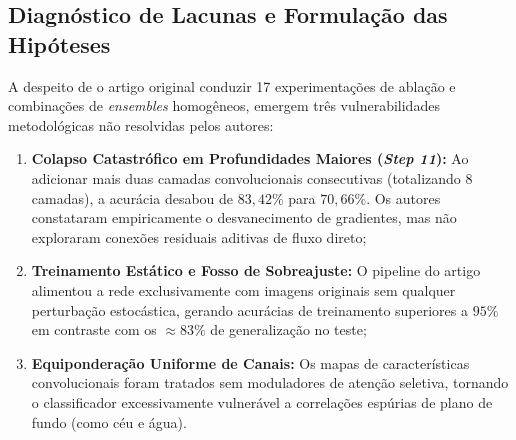 \documentclass[runningheads]{llncs}
\begin{document}
\subsection{Diagn\'{o}stico de Lacunas e Formula\c{c}\~{a}o das Hip\'{o}teses}
A despeito de o artigo original conduzir 17 experimenta\c{c}\~{o}es de abla\c{c}\~{a}o e combina\c{c}\~{o}es de \textit{ensembles} homog\^{e}neos, emergem tr\^{e}s vulnerabilidades metodol\'{o}gicas n\~{a}o resolvidas pelos autores:
\begin{enumerate}
    \item \textbf{Colapso Catastr\'{o}fico em Profundidades Maiores (\textit{Step 11}):} Ao adicionar mais duas camadas convolucionais consecutivas (totalizando 8 camadas), a acur\'{a}cia desabou de $83{,}42\%$ para $70{,}66\%$. Os autores constataram empiricamente o desvanecimento de gradientes, mas n\~{a}o exploraram conex\~{o}es residuais aditivas de fluxo direto;
    \item \textbf{Treinamento Est\'{a}tico e Fosso de Sobreajuste:} O pipeline do artigo alimentou a rede exclusivamente com imagens originais sem qualquer perturba\c{c}\~{a}o estoc\'{a}stica, gerando acur\'{a}cias de treinamento superiores a $95\%$ em contraste com os $\approx 83\%$ de generaliza\c{c}\~{a}o no teste;
    \item \textbf{Equipondera\c{c}\~{a}o Uniforme de Canais:} Os mapas de caracter\'{i}sticas convolucionais foram tratados sem moduladores de aten\c{c}\~{a}o seletiva, tornando o classificador excessivamente vulner\'{a}vel a correla\c{c}\~{o}es esp\'{u}rias de plano de fundo (como c\'{e}u e \'{a}gua).
\end{enumerate}
\end{document}
